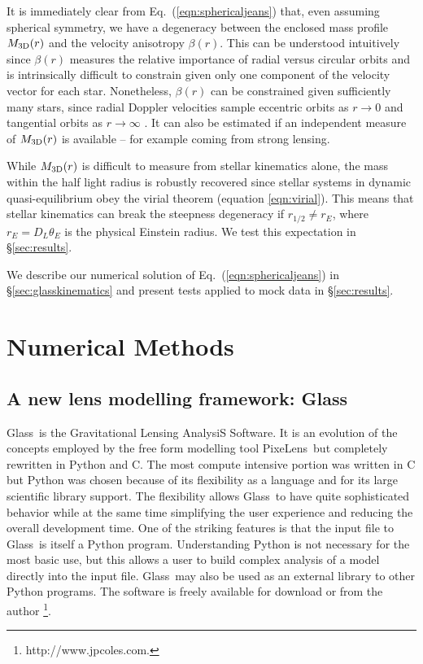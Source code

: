 \documentclass[galley,usenatbib]{mn2e}
\newcommand{\Glass}{{\sc Glass}}
\newcommand{\PixeLens}{{\sc PixeLens}}
\newcommand{\eqnref}[1] {Eq.~(\ref{#1})}
\begin{document}
It is immediately clear from \eqnref{eqn:sphericaljeans} that, even assuming
spherical symmetry, we have a degeneracy between the enclosed mass profile
$M_{\rm 3D}(r)$ and the velocity anisotropy $\beta(r)$. This can be understood
intuitively since $\beta(r)$ measures the relative importance of radial versus
circular orbits and is intrinsically difficult to constrain given only one
component of the velocity vector for each star. Nonetheless, $\beta(r)$ can be
constrained given sufficiently many stars, since radial Doppler velocities
sample eccentric orbits as $r\rightarrow 0$ and tangential orbits as
$r\rightarrow \infty$ \citep[e.g.][]{2002MNRAS.330..778W}. It can also be
estimated if an independent measure of $M_{\rm 3D}(r)$ is available -- for example
coming from strong lensing. 

While $M_{\rm 3D}(r)$ is difficult to measure from stellar kinematics alone, the mass within the half light radius is robustly recovered \citep[e.g.][]{2009ApJ...704.1274W,2010MNRAS.406.1220W,2012ApJ...754L..39A} since stellar systems in dynamic quasi-equilibrium obey the virial theorem (equation \ref{eqn:virial}). This means that stellar kinematics can break the steepness degeneracy if $r_{1/2} \neq r_E$, where $r_E = D_L \theta_E$ is the physical Einstein radius. We test this expectation in \S\ref{sec:results}.

We describe our numerical solution of \eqnref{eqn:sphericaljeans} in
\S\ref{sec:glasskinematics} and present tests applied to mock data in
\S\ref{sec:results}. 

\section{Numerical Methods}\label{sec:glass}

\subsection{A new lens modelling framework: \Glass}

\Glass\ is the Gravitational Lensing AnalysiS Software. It is an evolution of the concepts employed by the free form modelling tool
\PixeLens\ but completely rewritten in Python and C. 
The most compute intensive
portion was written in C but Python was chosen because of its flexibility as a 
language and for its large scientific library support. The flexibility allows 
\Glass\ to have quite sophisticated behavior while at the same time simplifying the 
user experience and reducing the overall development time. One of the striking
features is that the input file to \Glass\ is itself a Python program.
Understanding Python is not necessary for the most basic use, but this allows
a user to build complex analysis of a model directly into the input file. \Glass\
may also be used as an external library to other Python programs.  The software
is freely available for download or from the author%
%
\footnote{http://www.jpcoles.com.}.
\end{document}
